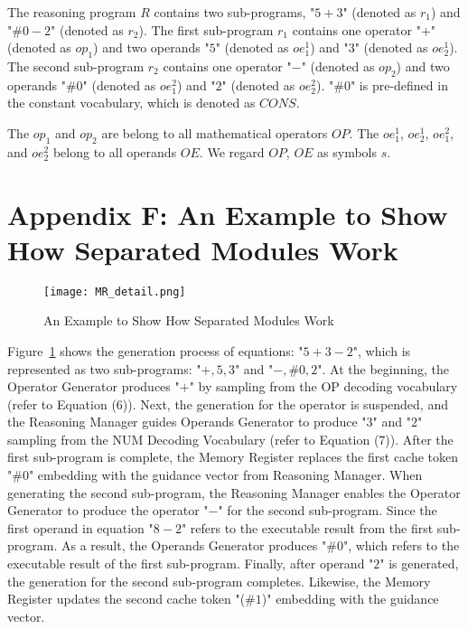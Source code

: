 \documentclass{article}
\begin{document}
The reasoning program \(R\) contains two sub-programs, "\(5+3\)" (denoted as \(r_1\)) and "\(\#0-2\)" (denoted as \(r_2\)). The first sub-program \(r_1\) contains one operator "\(+\)" (denoted as \(op_1\)) and two operands "\(5\)" (denoted as \(oe^{1}_{1}\)) and "\(3\)" (denoted as \(oe^{1}_{2}\)). The second sub-program \(r_2\) contains one operator "\( - \)" (denoted as \(op_2\)) and two operands "\(\#0\)" (denoted as \(oe^{2}_{1}\)) and "\(2\)" (denoted as \(oe^{2}_{2}\)). "\(\#0\)" is pre-defined in the constant vocabulary, which is denoted as \(\textit{CONS}\).

The \(op_1\) and \(op_2\) are belong to all mathematical operators \(\textit{OP}\). The \(oe^{1}_{1}\), \(oe^{1}_{2}\), \(oe^{2}_{1}\), and \(oe^{2}_{2}\) belong to all operands \(\textit{OE}\). We regard \(\textit{OP}\), \(\textit{OE}\) as symbols \(s\).


\section*{Appendix F: An Example to Show How Separated Modules Work}
\label{appendix:e}

\begin{figure}[tbhp!] 
\centering 
\texttt{[image: MR\_detail.png]} 
\caption{ An Example to Show How Separated Modules Work} 
\label{fig:MR_detail}
\end{figure}

Figure~\ref{fig:MR_detail} shows the generation process of equations: "\(5+3-2\)", which is represented as two sub-programs: "\(+,5,3\)" and "\(-,\#0,2\)". At the beginning, the Operator Generator produces "\(+\)" by sampling from the OP decoding vocabulary (refer to Equation (6)). Next, the generation for the operator is suspended, and the Reasoning Manager guides Operands Generator to produce "\(3\)" and "\(2\)" sampling from the NUM Decoding Vocabulary (refer to Equation (7)). After the first sub-program is complete, the Memory Register replaces the first cache token "\(\#0\)" embedding with the guidance vector from Reasoning Manager. When generating the second sub-program, the Reasoning Manager enables the Operator Generator to produce the operator "\(-\)" for the second sub-program. Since the first operand in equation "\(8-2\)" refers to the executable result from the first sub-program. As a result, the Operands Generator produces "\(\#0\)", which refers to the executable result of the first sub-program. Finally, after operand "\(2\)" is generated, the generation for the second sub-program completes. Likewise, the Memory Register updates the second cache token "(\(\#1\))" embedding with the guidance vector.
\end{document}
